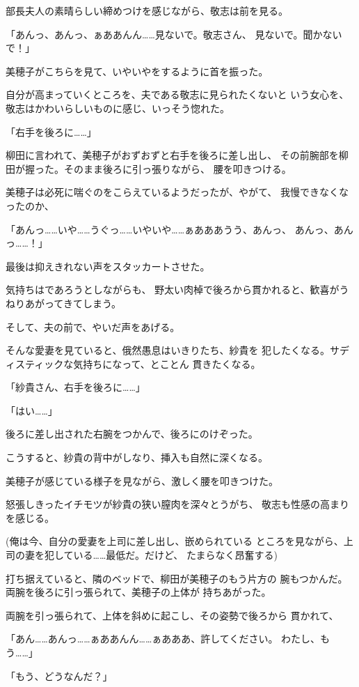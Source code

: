﻿\documentclass[
    book,tate,
    line_length=30zw,
    jafontsize=12pt,
    paper=b5j,
    landscape,
    ]{jlreq}
\begin{document}
部長夫人の素晴らしい締めつけを感じながら、敬志は前を見る。

「あんっ、あんっ、ぁああんん……見ないで。敬志さん、
見ないで。聞かないで！」

美穂子がこちらを見て、いやいやをするように首を振った。

自分が高まっていくところを、夫である敬志に見られたくないと
いう女心を、敬志はかわいらしいものに感じ、いっそう惚れた。

「右手を後ろに……」

柳田に言われて、美穂子がおずおずと右手を後ろに差し出し、
その前腕部を柳田が握った。そのまま後ろに引っ張りながら、
腰を叩きつける。

美穂子は必死に喘ぐのをこらえているようだったが、やがて、
我慢できなくなったのか、

「あんっ……いや……うぐっ……いやいや……ぁあああうう、あんっ、
あんっ、あんっ……！」

最後は抑えきれない声をスタッカートさせた。

気持ちはであろうとしながらも、
野太い肉棹で後ろから貫かれると、歓喜がうねりあがってきてしまう。

そして、夫の前で、やいだ声をあげる。

そんな愛妻を見ていると、俄然愚息はいきりたち、紗貴を
犯したくなる。サディスティックな気持ちになって、とことん
貫きたくなる。

「紗貴さん、右手を後ろに……」

「はい……」

後ろに差し出された右腕をつかんで、後ろにのけぞった。

こうすると、紗貴の背中がしなり、挿入も自然に深くなる。

美穂子が感じている様子を見ながら、激しく腰を叩きつけた。

怒張しきったイチモツが紗貴の狭い膣肉を深々とうがち、
敬志も性感の高まりを感じる。

(俺は今、自分の愛妻を上司に差し出し、嵌められている
ところを見ながら、上司の妻を犯している……最低だ。だけど、
たまらなく昂奮する)

打ち据えていると、隣のベッドで、柳田が美穂子のもう片方の
腕もつかんだ。両腕を後ろに引っ張られて、美穂子の上体が
持ちあがった。

両腕を引っ張られて、上体を斜めに起こし、その姿勢で後ろから
貫かれて、

「あん……あんっ……ぁああんん……ぁあああ、許してください。
わたし、もう……」

「もう、どうなんだ？」
\end{document}
